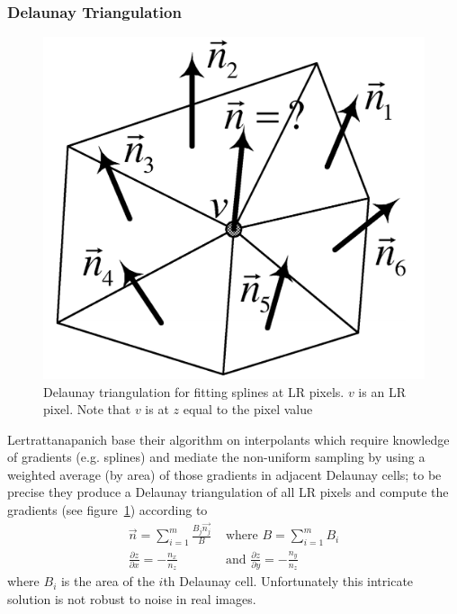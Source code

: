 \subsubsection{Delaunay Triangulation}

\begin{figure}
	\centering
	\includegraphics[width=.7\linewidth]{figures/delauney.png}
	\caption{Delaunay triangulation for fitting splines at LR pixels\cite{Lertrattanapanich}. $v$ is an LR pixel. Note that $v$ is at $z$ equal to the pixel value}
	\label{fig:delauney}
\end{figure}
Lertrattanapanich \cite{Lertrattanapanich} base their algorithm on interpolants which require knowledge of gradients (e.g. splines) and mediate the non-uniform sampling by using a weighted average (by area) of those gradients in adjacent Delaunay cells; to be precise they produce a Delaunay triangulation of all LR pixels and compute the gradients (see figure~\ref{fig:delauney}) according to
\begin{align*}
	\vec{n} = \sum_{i=1}^m \frac{B_j \vec{n_j}}{B}   & \text{ where } B=\sum_{i=1}^m B_i                              \\
	\frac{\partial z}{\partial x} = -\frac{n_x}{n_z} & \text{ and }  \frac{\partial z}{\partial y} = -\frac{n_y}{n_z}
\end{align*}
where $B_i$ is the area of the $i$th Delaunay cell.
%
Unfortunately this intricate solution is not robust to noise in real images.
